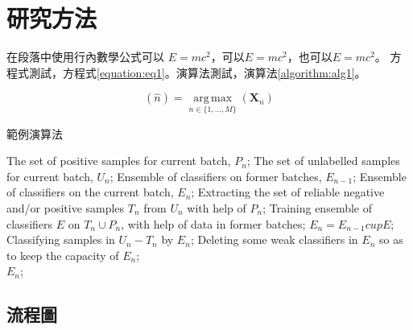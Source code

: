
\section{研究方法}

在段落中使用行內數學公式可以 \begin{math}E=mc^2\end{math}，可以$E=mc^2$，也可以\(E=mc^2\)。
方程式測試，方程式\ref{equation:eq1}。演算法測試，演算法\ref{algorithm:alg1}。

\begin{equation}[htbp]
    \label{equation:eq1}
    (\hat{n})=\operatorname*{arg\,max}_{n\in \{1,\dots,M\}}(\mathbf{X}_{n})
\end{equation}

\begin{algorithm}[htbp]
    \caption{範例演算法}
    \label{algorithm:alg1}
    \begin{algorithmic}[1]
        \Require
        The set of positive samples for current batch, $P_n$;
        The set of unlabelled samples for current batch, $U_n$;
        Ensemble of classifiers on former batches, $E_{n-1}$;
        \Ensure
        Ensemble of classifiers on the current batch, $E_n$;
        \State Extracting the set of reliable negative and/or positive samples $T_n$ from $U_n$ with help of $P_n$;
        \label{code:fram:extract}
        \State Training ensemble of classifiers $E$ on $T_n \cup P_n$, with help of data in former batches;
        \label{code:fram:trainbase}
        \State $E_n=E_{n-1}cup E$;
        \label{code:fram:add}
        \State Classifying samples in $U_n-T_n$ by $E_n$;
        \label{code:fram:classify}
        \State Deleting some weak classifiers in $E_n$ so as to keep the capacity of $E_n$;
        \label{code:fram:select} \\
        \Return $E_n$;
    \end{algorithmic}
\end{algorithm}

\subsection{流程圖}

